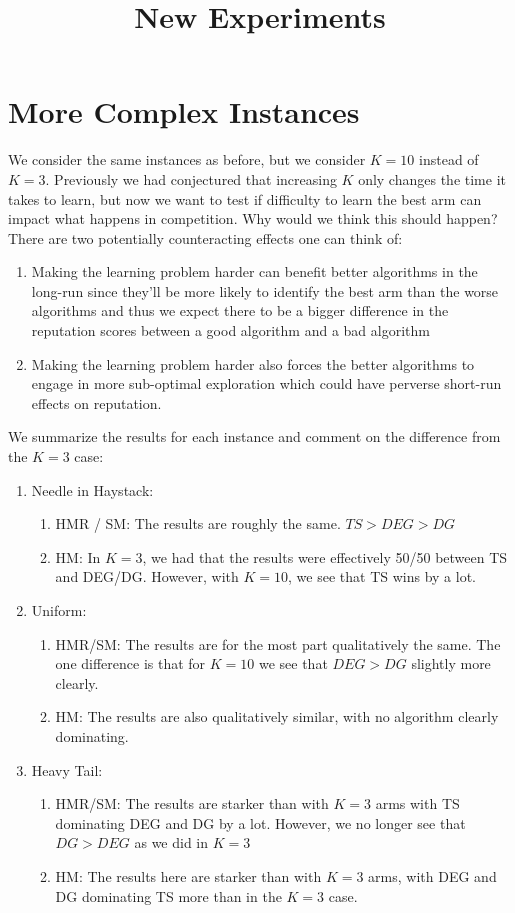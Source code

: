 \documentclass[11pt,letterpaper]{article}
\begin{document}
 

\title{New Experiments}
\maketitle


\section*{More Complex Instances}
We consider the same instances as before, but we consider $K = 10$ instead of $K = 3$. Previously we had conjectured that increasing $K$ only changes the time it takes to learn, but now we want to test if difficulty to learn the best arm can impact what happens in competition. Why would we think this should happen? There are two potentially counteracting effects one can think of:
\begin{enumerate}
\item Making the learning problem harder can benefit better algorithms in the long-run since they'll be more likely to identify the best arm than the worse algorithms and thus we expect there to be a bigger difference in the reputation scores between a good algorithm and a bad algorithm
\item Making the learning problem harder also forces the better algorithms to engage in more sub-optimal exploration which could have perverse short-run effects on reputation.
\end{enumerate}

We summarize the results for each instance and comment on the difference from the $K=3$ case:
\begin{enumerate}
\item Needle in Haystack:
\begin{enumerate}
\item HMR / SM: The results are roughly the same. $TS > DEG > DG$
\item HM: In $K=3$, we had that the results were effectively 50/50 between TS and DEG/DG. However, with $K=10$, we see that TS wins by a lot.
\end{enumerate}
\item Uniform:
\begin{enumerate}
\item HMR/SM: The results are for the most part qualitatively the same. The one difference is that for $K = 10$ we see that $DEG > DG$ slightly more clearly.
\item HM: The results are also qualitatively similar, with no algorithm clearly dominating.
\end{enumerate}
\item Heavy Tail:
\begin{enumerate}
\item HMR/SM: The results are starker than with $K = 3$ arms with TS dominating DEG and DG by a lot. However, we no longer see that $DG > DEG$ as we did in $K = 3$
\item HM: The results here are starker than with $K = 3$ arms, with DEG and DG dominating TS more than in the $K = 3$ case. 
\end{enumerate}
\end{enumerate}

\end{document}
